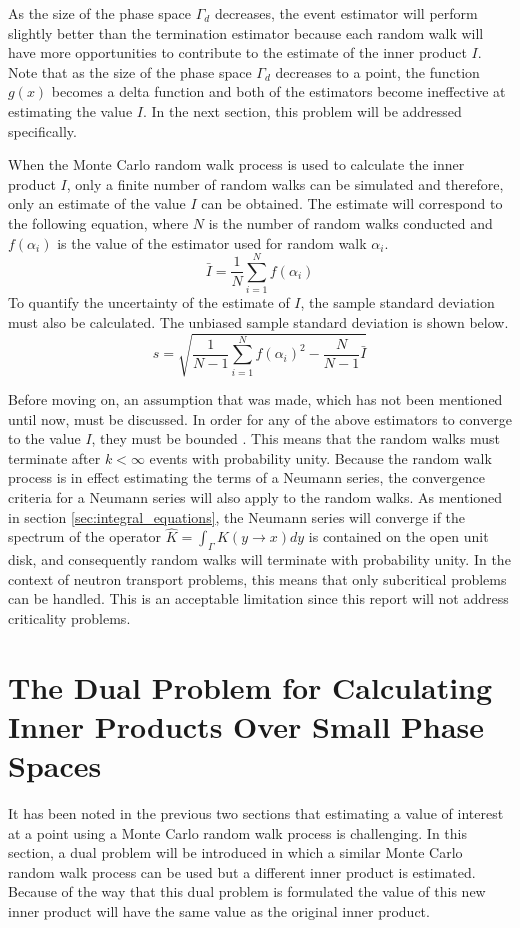 As the size of the phase space $\Gamma_d$ decreases, the event estimator 
will perform slightly better than the termination estimator because each random
walk will have more opportunities to contribute to the estimate of the inner 
product $I$. Note that as the size of the phase space $\Gamma_d$ decreases to a 
point, the function $g(x)$ becomes a delta function and both of the estimators 
become ineffective at estimating the value $I$. In the next section, this 
problem will be addressed specifically.

When the Monte Carlo random walk process is used to calculate the inner product
$I$, only a finite number of random walks can be simulated and therefore, only 
an estimate of the value $I$ can be obtained. The estimate will
correspond to the following equation, where $N$ is the number of random walks
conducted and $f(\alpha_i)$ is the value of the estimator used for random
walk $\alpha_i$.
\begin{equation}
  \bar{I} = \frac{1}{N} \sum_{i=1}^N f(\alpha_i)
  \label{eq:inner_product_estimate}
\end{equation}
To quantify the uncertainty of the estimate of $I$, the sample standard 
deviation must also be calculated. The unbiased sample standard deviation is 
shown below.
\begin{equation}
  s = \sqrt{\frac{1}{N-1}\sum_{i=1}^N f(\alpha_i)^2 - \frac{N}{N-1}\bar{I}}
  \label{eq:inner_product_stddev}
\end{equation}

Before moving on, an assumption that was made, which has not been mentioned
until now, must be discussed. In order for any of the above estimators to 
converge to the value $I$, they must be bounded \citep{spanier_monte_1969}. This
means that the random walks must terminate after $k < \infty$ events with 
probability unity. Because the random walk process is in effect estimating the
terms of a Neumann series, the convergence criteria for a Neumann series will
also apply to the random walks. As mentioned in section 
\ref{sec:integral_equations}, the Neumann series will converge if the spectrum
of the operator $\hat{K} = \int_{\Gamma} K(y \to x)dy$ is contained on the open
unit disk, and consequently random walks will terminate with probability unity.
In the context of neutron transport problems, this means that only subcritical 
problems can be handled. This is an acceptable limitation since this report 
will not address criticality problems.

\section{The Dual Problem for Calculating Inner Products Over Small Phase 
  Spaces}
\label{sec:dual_problems}
It has been noted in the previous two sections that estimating a value of 
interest at a point using a Monte Carlo random walk process is challenging.
In this section, a dual problem will be introduced in which a similar Monte 
Carlo random walk process can be used but a different inner product is 
estimated. Because of the way that this dual problem is formulated the value of 
this new inner product will have the same value as the original inner product. 

